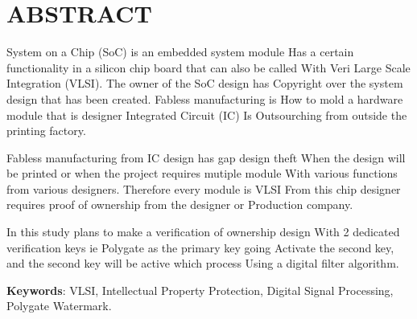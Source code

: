 \chapter*{ABSTRACT}

\noindent System on a Chip (SoC) is an embedded system module
Has a certain functionality in a silicon chip board that can also be called
With Veri Large Scale Integration (VLSI). The owner of the SoC design has
Copyright over the system design that has been created. Fabless manufacturing is
How to mold a hardware module that is designer Integrated Circuit (IC)
Is Outsourching from outside the printing factory.

\vspace*{0.5cm}
\noindent Fabless manufacturing from IC design has gap design theft
When the design will be printed or when the project requires mutiple module
With various functions from various designers. Therefore every module is VLSI
From this chip designer requires proof of ownership from the designer or
Production company.

\vspace*{0.5cm}
\noindent In this study plans to make a verification of ownership design
With 2 dedicated verification keys ie Polygate as the primary key going
Activate the second key, and the second key will be active which process
Using a digital filter algorithm.

\vspace*{0.2cm}

\noindent \textbf{Keywords}: VLSI, Intellectual Property Protection, Digital Signal Processing, Polygate Watermark.

\newpage